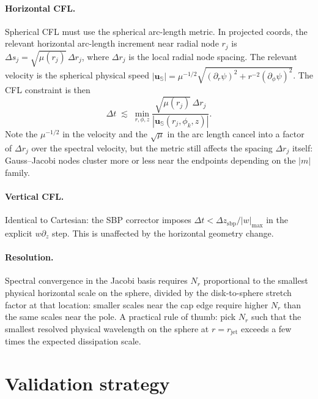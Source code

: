 \documentclass[11pt]{article}
\newcommand{\rjet}{r_{\mathrm{jet}}}
\newcommand{\bu}{\bm{u}}
\begin{document}
\paragraph{Horizontal CFL.}  Spherical CFL must use the spherical
arc-length metric.  In projected coords, the relevant horizontal
arc-length increment near radial node $r_{j}$ is $\Delta s_{j} =
\sqrt{\mu(r_{j})}\,\Delta r_{j}$, where $\Delta r_{j}$ is the local
radial node spacing.  The relevant velocity is the spherical
physical speed
$|\bu_{\mathbb{S}}| = \mu^{-1/2}\sqrt{(\partial_{r}\psi)^{2} +
r^{-2}(\partial_{\phi}\psi)^{2}}$.  The CFL constraint is then
\begin{equation}
  \Delta t \;\lesssim\; \min_{r, \phi, z}
  \frac{\sqrt{\mu(r_{j})}\,\Delta r_{j}}
  {|\bu_{\mathbb{S}}(r_{j}, \phi_{k}, z)|}.
\end{equation}
Note the $\mu^{-1/2}$ in the velocity and the $\sqrt{\mu}$ in the
arc length cancel into a factor of $\Delta r_{j}$ over the spectral
velocity, but the metric still affects the spacing $\Delta r_{j}$
itself: Gauss--Jacobi nodes cluster more or less near the endpoints
depending on the $|m|$ family.

\paragraph{Vertical CFL.}  Identical to Cartesian: the SBP corrector
imposes $\Delta t < \Delta z_{\mathrm{sbp}}/|w|_{\max}$ in the
explicit $w \partial_{z}$ step.  This is unaffected by the horizontal
geometry change.

\paragraph{Resolution.}  Spectral convergence in the Jacobi basis
requires $N_{r}$ proportional to the smallest physical horizontal
scale on the sphere, divided by the disk-to-sphere stretch factor at
that location: smaller scales near the cap edge require higher
$N_{r}$ than the same scales near the pole.  A practical rule of
thumb: pick $N_{r}$ such that the smallest resolved physical
wavelength on the sphere at $r=\rjet$ exceeds a few times the
expected dissipation scale.

\section{Validation strategy}
\end{document}
